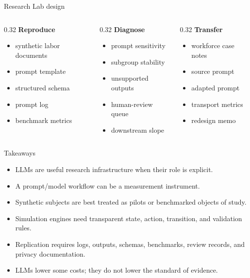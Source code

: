 \documentclass[aspectratio=169,11pt]{beamer}
\newcommand{\1}{\mathbf{1}}
\begin{document}
\begin{frame}{Research Lab design}
\begin{columns}[T,onlytextwidth]
\begin{column}{0.32\linewidth}
\textbf{Reproduce}
\begin{itemize}
    \item synthetic labor documents
    \item prompt template
    \item structured schema
    \item prompt log
    \item benchmark metrics
\end{itemize}
\end{column}
\begin{column}{0.32\linewidth}
\textbf{Diagnose}
\begin{itemize}
    \item prompt sensitivity
    \item subgroup stability
    \item unsupported outputs
    \item human-review queue
    \item downstream slope
\end{itemize}
\end{column}
\begin{column}{0.32\linewidth}
\textbf{Transfer}
\begin{itemize}
    \item workforce case notes
    \item source prompt
    \item adapted prompt
    \item transport metrics
    \item redesign memo
\end{itemize}
\end{column}
\end{columns}
\end{frame}

\begin{frame}{Takeaways}
\begin{itemize}
    \item LLMs are useful research infrastructure when their role is explicit.
    \item A prompt/model workflow can be a measurement instrument.
    \item Synthetic subjects are best treated as pilots or benchmarked objects of study.
    \item Simulation engines need transparent state, action, transition, and validation rules.
    \item Replication requires logs, outputs, schemas, benchmarks, review records, and privacy documentation.
    \item LLMs lower some costs; they do not lower the standard of evidence.
\end{itemize}
\end{frame}
\end{document}
